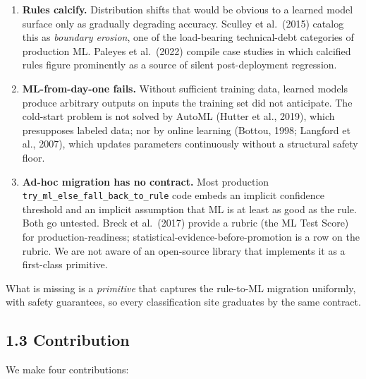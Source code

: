 \begin{enumerate}
\def\labelenumi{\arabic{enumi}.}
\item
  \textbf{Rules calcify.} Distribution shifts that would be obvious to a
  learned model surface only as gradually degrading accuracy. Sculley et
  al.~(2015) catalog this as \emph{boundary erosion}, one of the
  load-bearing technical-debt categories of production ML. Paleyes et
  al.~(2022) compile case studies in which calcified rules figure
  prominently as a source of silent post-deployment regression.
\item
  \textbf{ML-from-day-one fails.} Without sufficient training data,
  learned models produce arbitrary outputs on inputs the training set
  did not anticipate. The cold-start problem is not solved by AutoML
  (Hutter et al., 2019), which presupposes labeled data; nor by online
  learning (Bottou, 1998; Langford et al., 2007), which updates
  parameters continuously without a structural safety floor.
\item
  \textbf{Ad-hoc migration has no contract.} Most production
  \texttt{try\_ml\_else\_fall\_back\_to\_rule} code embeds an implicit
  confidence threshold and an implicit assumption that ML is at least as
  good as the rule. Both go untested. Breck et al.~(2017) provide a
  rubric (the ML Test Score) for production-readiness;
  statistical-evidence-before-promotion is a row on the rubric. We are
  not aware of an open-source library that implements it as a
  first-class primitive.
\end{enumerate}

What is missing is a \emph{primitive} that captures the rule-to-ML
migration uniformly, with safety guarantees, so every classification
site graduates by the same contract.

\subsection{1.3 Contribution}\label{contribution}

We make four contributions:

